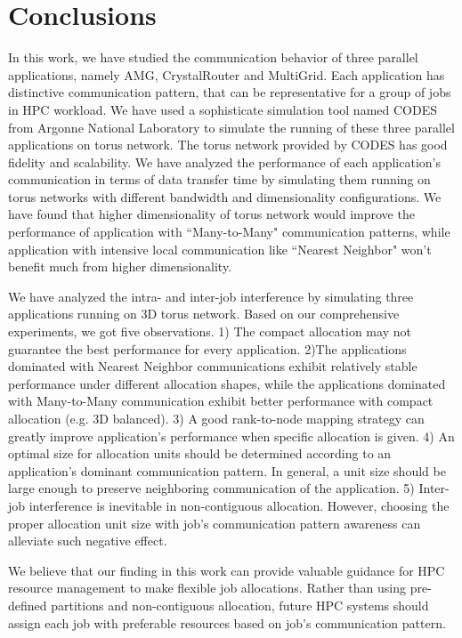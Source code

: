 \section{Conclusions}
\label{sec:conclusion}
In this work, we have studied the communication behavior of three parallel applications, namely AMG, CrystalRouter and MultiGrid. Each application has distinctive communication pattern, that can be representative for a group of jobs in HPC workload. We have used a sophisticate simulation tool named CODES from Argonne National Laboratory to simulate the running of these three parallel applications on torus network. The torus network provided by CODES has good fidelity and scalability. We have analyzed the performance of each application's communication in terms of data transfer time by simulating them running on torus networks with different bandwidth and dimensionality configurations. We have found that higher dimensionality of torus network would improve the performance of application with ``Many-to-Many" communication patterns, while application with intensive local communication like ``Nearest Neighbor" won't benefit much from higher dimensionality.

We have analyzed the intra- and inter-job interference by simulating three applications running on 3D torus network. Based on our comprehensive experiments, we got five observations. 1) The compact allocation may not guarantee the best performance for every application. 2)The applications dominated with Nearest Neighbor communications exhibit relatively stable performance under different allocation shapes, while the applications dominated with Many-to-Many communication exhibit better performance with compact allocation (e.g. 3D balanced). 3) A good rank-to-node mapping strategy can greatly improve application's performance when specific allocation is given. 4) An optimal size for allocation units should be determined according to an application's dominant communication pattern. In general, a unit size should be large enough to preserve neighboring communication of the application. 5) Inter-job interference is inevitable in non-contiguous allocation. However, choosing the proper allocation unit size with job's communication pattern awareness can alleviate such negative effect.


We believe that our finding in this work can provide valuable guidance for HPC resource management to make flexible job allocations. Rather than using pre-defined partitions and non-contiguous allocation, future HPC systems should assign each job with preferable resources based on job's communication pattern. 

